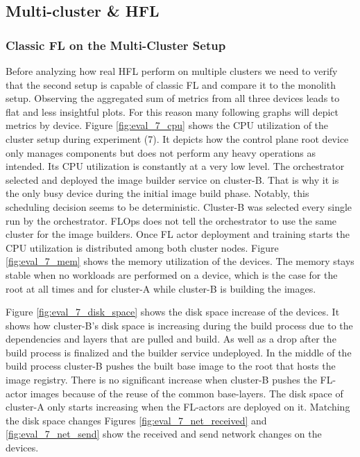 
\subsection{Multi-cluster \& HFL}

\subsubsection{Classic FL on the Multi-Cluster Setup}

Before analyzing how real HFL perform on multiple clusters we need to verify that the second setup is capable of classic FL and compare it to the monolith setup.
Observing the aggregated sum of metrics from all three devices leads to flat and less insightful plots.
For this reason many following graphs will depict metrics by device.
Figure \ref{fig:eval_7_cpu} shows the CPU utilization of the cluster setup during experiment (7).
It depicts how the control plane root device only manages components but does not perform any heavy operations as intended.
Its CPU utilization is constantly at a very low level.
The orchestrator selected and deployed the image builder service on cluster-B.
That is why it is the only busy device during the initial image build phase.
Notably, this scheduling decision seems to be deterministic.
Cluster-B was selected every single run by the orchestrator.
FLOps does not tell the orchestrator to use the same cluster for the image builders.
Once FL actor deployment and training starts the CPU utilization is distributed among both cluster nodes.
Figure \ref{fig:eval_7_mem} shows the memory utilization of the devices.
The memory stays stable when no workloads are performed on a device, which is the case for the root at all times and for cluster-A while cluster-B is building the images. 

Figure \ref{fig:eval_7_disk_space} shows the disk space increase of the devices.
It shows how cluster-B's disk space is increasing during the build process due to the dependencies and layers that are pulled and build.
As well as a drop after the build process is finalized and the builder service undeployed.
In the middle of the build process cluster-B pushes the built base image to the root that hosts the image registry.
There is no significant increase when cluster-B pushes the FL-actor images because of the reuse of the common base-layers.
The disk space of cluster-A only starts increasing when the FL-actors are deployed on it.
Matching the disk space changes Figures \ref{fig:eval_7_net_received} and \ref{fig:eval_7_net_send} show the received and send network changes on the devices.

